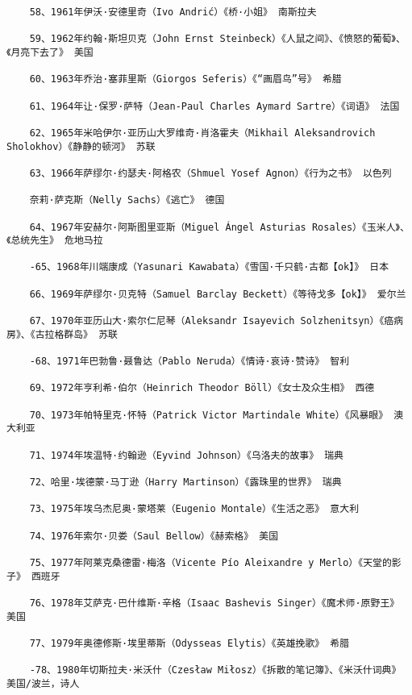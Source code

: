 \documentclass[UTF8]{../RepresentationUniverse}
\begin{document}
\begin{lstlisting}
    58、1961年伊沃·安德里奇（Ivo Andrić）《桥·小姐》 南斯拉夫
    
    59、1962年约翰·斯坦贝克（John Ernst Steinbeck）《人鼠之间》、《愤怒的葡萄》、《月亮下去了》 美国
    
    60、1963年乔治·塞菲里斯（Giorgos Seferis）《“画眉鸟”号》 希腊
    
    61、1964年让·保罗·萨特（Jean-Paul Charles Aymard Sartre）《词语》 法国
    
    62、1965年米哈伊尔·亚历山大罗维奇·肖洛霍夫（Mikhail Aleksandrovich Sholokhov）《静静的顿河》 苏联
    
    63、1966年萨缪尔·约瑟夫·阿格农（Shmuel Yosef Agnon）《行为之书》 以色列
    
    奈莉·萨克斯（Nelly Sachs）《逃亡》 德国
    
    64、1967年安赫尔·阿斯图里亚斯（Miguel Ángel Asturias Rosales）《玉米人》、《总统先生》 危地马拉
    
    -65、1968年川端康成（Yasunari Kawabata）《雪国·千只鹤·古都【ok】》 日本
    
    66、1969年萨缪尔·贝克特（Samuel Barclay Beckett）《等待戈多【ok】》 爱尔兰
    
    67、1970年亚历山大·索尔仁尼琴（Aleksandr Isayevich Solzhenitsyn）《癌病房》、《古拉格群岛》 苏联
    
    -68、1971年巴勃鲁·聂鲁达（Pablo Neruda）《情诗·哀诗·赞诗》 智利
    
    69、1972年亨利希·伯尔（Heinrich Theodor Böll）《女士及众生相》 西德
    
    70、1973年帕特里克·怀特（Patrick Victor Martindale White）《风暴眼》 澳大利亚
    
    71、1974年埃温特·约翰逊（Eyvind Johnson）《乌洛夫的故事》 瑞典
    
    72、哈里·埃德蒙·马丁逊（Harry Martinson）《露珠里的世界》 瑞典
    
    73、1975年埃乌杰尼奥·蒙塔莱（Eugenio Montale）《生活之恶》 意大利
    
    74、1976年索尔·贝娄（Saul Bellow）《赫索格》 美国
    
    75、1977年阿莱克桑德雷·梅洛（Vicente Pío Aleixandre y Merlo）《天堂的影子》 西班牙
    
    76、1978年艾萨克·巴什维斯·辛格（Isaac Bashevis Singer）《魔术师·原野王》 美国
    
    77、1979年奥德修斯·埃里蒂斯（Odysseas Elytis）《英雄挽歌》 希腊
    
    -78、1980年切斯拉夫·米沃什（Czesław Miłosz）《拆散的笔记簿》、《米沃什词典》 美国/波兰，诗人
    

\end{lstlisting}
\end{document}
